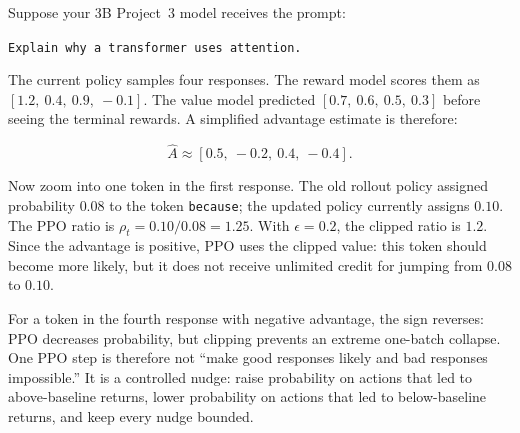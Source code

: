 \begin{tcolorbox}[colback=blue!5, colframe=blue!40, title=\textbf{Worked Example: One PPO Step}]
Suppose your 3B Project~3 model receives the prompt:

\medskip
\noindent\texttt{Explain why a transformer uses attention.}

\medskip
\noindent The current policy samples four responses. The reward model scores them as $[1.2,\ 0.4,\ 0.9,\ -0.1]$. The value model predicted $[0.7,\ 0.6,\ 0.5,\ 0.3]$ before seeing the terminal rewards. A simplified advantage estimate is therefore:

\[
\hat{A} \approx [0.5,\ -0.2,\ 0.4,\ -0.4].
\]

Now zoom into one token in the first response. The old rollout policy assigned probability $0.08$ to the token \texttt{because}; the updated policy currently assigns $0.10$. The PPO ratio is $\rho_t = 0.10 / 0.08 = 1.25$. With $\epsilon = 0.2$, the clipped ratio is $1.2$. Since the advantage is positive, PPO uses the clipped value: this token should become more likely, but it does not receive unlimited credit for jumping from $0.08$ to $0.10$.

For a token in the fourth response with negative advantage, the sign reverses: PPO decreases probability, but clipping prevents an extreme one-batch collapse. One PPO step is therefore not ``make good responses likely and bad responses impossible.'' It is a controlled nudge: raise probability on actions that led to above-baseline returns, lower probability on actions that led to below-baseline returns, and keep every nudge bounded.
\end{tcolorbox}

\noindent{}

